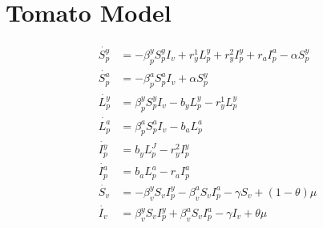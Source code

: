 \section{Tomato Model}
	\begin{align}
		\dot{S^y_p} &= -\beta^y_p S^y_p I_v + r^1_y L^y_p + r^2_y I^y_p + r_a I^a_p-\alpha S^y_p\\
		\dot{S^a_p} &= -\beta^a_p S^a_p I_v + \alpha S^y_p\\
		\dot{L^y_p} &= \beta^y_p S^y_p I_v - b_y L^y_p - r^1_y L^y_p\\
		\dot{L^a_p} &= \beta^a_p S^a_p I_v -b_a L^a_p\\
		\dot{I^y_p} &= b_y L^J_p - r^2_y I^y_p\\
		\dot{I^a_p} &= b_a L^a_p - r_a I^a_p\\
		\dot{S_v} &= -\beta^y_v S_v I^y_p - \beta^a_v S_v I^a_p -\gamma S_v +(1-\theta) \mu \\
		\dot{I_v} &= \beta^y_v S_v I^y_p + \beta^a_v S_v I^a_p - \gamma I_v +\theta \mu
	\end{align}